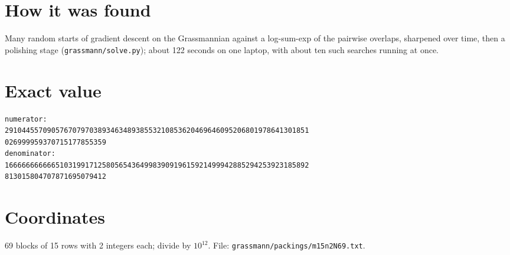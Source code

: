 \documentclass[11pt,a4paper]{article}
\begin{document}
\section{How it was found}
Many random starts of gradient descent on the Grassmannian against a log-sum-exp of the pairwise overlaps, sharpened over time, then a polishing stage (\texttt{grassmann/solve.py}); about 122 seconds on one laptop, with about ten such searches running at once.


\appendix
\section{Exact value}
{\small
\begin{verbatim}
numerator:
291044557090576707970389346348938553210853620469646095206801978641301851
026999959370715177855359
denominator:
166666666666510319917125805654364998390919615921499942885294253923185892
813015804707871695079412
\end{verbatim}}

\section{Coordinates}
69 blocks of 15 rows with 2 integers each; divide by $10^{12}$. File: \texttt{grassmann/packings/m15n2N69.txt}.
{\tiny
\begin{multicols}{4}
\end{multicols}}
\end{document}
